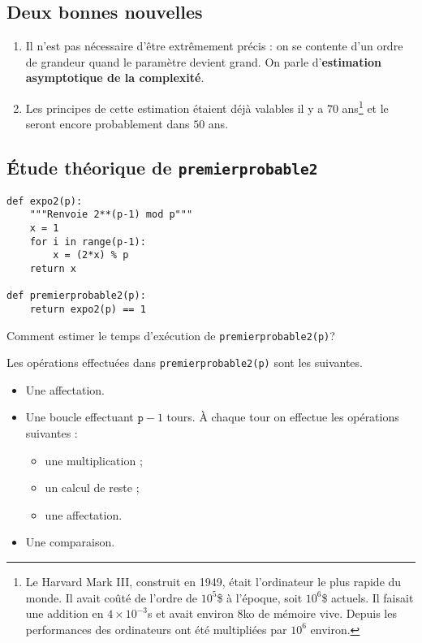 \subsection{Deux bonnes nouvelles}

\begin{enumerate}
\item Il n'est pas nécessaire d'être extrêmement précis : on se  contente d'un ordre de grandeur quand le paramètre devient grand. On
  parle d'\textbf{estimation asymptotique de la complexité}.
\item Les principes de cette estimation étaient déjà
  valables il y a $70$ ans\footnote{Le Harvard Mark III, construit en
    1949, était  l'ordinateur le plus rapide du
    monde. Il avait coûté de l'ordre de $10^{5}$\$ à l'époque, soit
    $10^{6}$\$ actuels. Il faisait une addition en $4\times 10^{-3}$s
    et avait environ $8$ko de mémoire vive. Depuis les performances
    des ordinateurs ont été multipliées par $10^{6}$ environ.} et le
  seront encore probablement dans $50$ ans.
\end{enumerate}

\subsection{Étude théorique de \texttt{premierprobable2}}

\begin{lstlisting}
def expo2(p):
    """Renvoie 2**(p-1) mod p"""
    x = 1
    for i in range(p-1):
        x = (2*x) % p
    return x  
    
def premierprobable2(p):
    return expo2(p) == 1
\end{lstlisting}

Comment estimer le temps d'exécution de \texttt{premierprobable2(p)}?

Les opérations effectuées dans \texttt{premierprobable2(p)} sont les suivantes.
\begin{itemize}
\item Une affectation.
\item Une boucle effectuant $\texttt{p}-1$ tours. À chaque tour on
  effectue les opérations suivantes :
  \begin{itemize}
  \item une multiplication ;
  \item un calcul de reste ;
  \item une affectation.
  \end{itemize}
\item Une comparaison.
\end{itemize}

